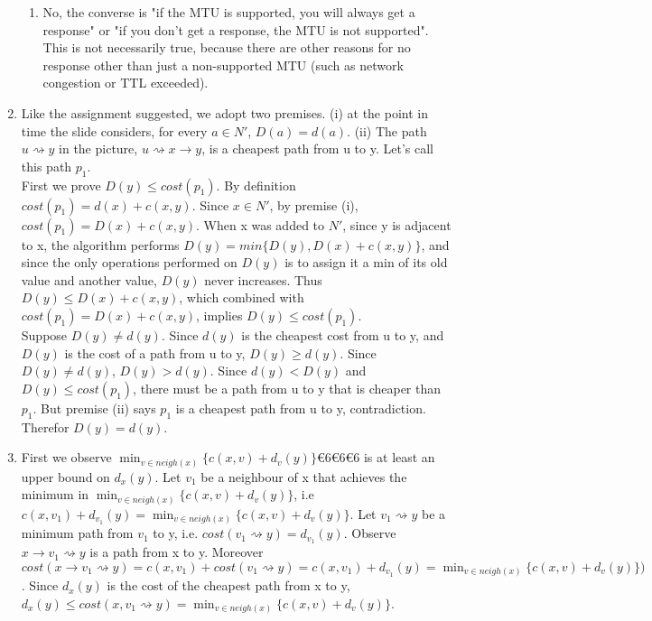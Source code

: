 \documentclass[12pt]{article}
\begin{document}
\begin{enumerate}
\begin{enumerate}
		\item No, the converse is "if the MTU is supported, you will always get a response" or "if you don't get a response, the MTU is not supported". This is not necessarily true, because there are other reasons for no response other than just a non-supported MTU (such as network congestion or TTL exceeded).
	\end{enumerate}
	\item %
        Like the assignment suggested, we adopt two premises. 
        (i) at the point in time the slide considers, for every $a \in N'$, $D(a) = d(a)$. 
        (ii) The path $u \rightsquigarrow y$ in the picture, $u \rightsquigarrow x \rightarrow y$,
        is a cheapest path from u to y. Let's call this path $p_1$.\\


        First we prove $D(y) \leq cost(p_1)$. By definition $cost(p_1) = d(x) + c(x,y)$. Since $x \in N'$, 
        by premise (i), $cost(p_1) = D(x) + c(x,y)$. When x was added to $N'$, since y is adjacent to x,
        the algorithm performs $D(y) = min\{D(y), D(x)+c(x,y)\}$, and since the only operations performed on $D(y)$ is to assign
        it a min of its old value and another value, $D(y)$ never increases. Thus $D(y) \leq D(x) + c(x,y)$,
        which combined with $cost(p_1) = D(x) + c(x,y)$, implies $D(y) \leq cost(p_1)$. \\

        Suppose $D(y) \neq d(y)$. Since $d(y)$ is the cheapest cost from u to y, and $D(y)$ is the 
        cost of a path from u to y, $D(y) \geq d(y)$. Since $D(y) \neq d(y)$, $D(y) > d(y)$. 
        Since $d(y) < D(y)$ and $D(y) \leq cost(p_1)$, there must be a path from u to y that is cheaper 
        than $p_1$. But premise (ii) says $p_1$ is a cheapest path from u to y, contradiction. Therefor $D(y) = d(y)$.
        

	\item %
        
        First we observe $\min_{v \in neigh(x)}\{c(x,v) + d_v(y)\}666$
        is at least an upper bound on $d_x(y)$. Let $v_1$ be a neighbour of x that achieves the minimum in
        $\min_{v \in neigh(x)}\{c(x,v) + d_v(y)\}$, i.e $c(x,v_1)+d_{v_1}(y) = \min_{v \in neigh(x)}\{c(x,v) + d_v(y)\}$.  
        Let $v_1 \rightsquigarrow y$ be a minimum path from $v_1$
        to y, i.e. $cost(v_1 \rightsquigarrow y) = d_{v_1}(y)$. Observe $x \rightarrow v_1 \rightsquigarrow y$ is a path from x to y. Moreover
        $cost(x \rightarrow v_1 \rightsquigarrow y) = c(x, v_1) + cost(v_1 \rightsquigarrow y) = c(x, v_1) + d_{v_1}(y) =
        \min_{v \in neigh(x)}\{c(x,v) + d_v(y)\})$.
        Since $d_x(y)$ is the cost of the cheapest path from x to y, 
        $d_x(y) \leq cost(x,v_1 \rightsquigarrow y) = \min_{v \in neigh(x)}\{c(x,v) + d_v(y)\}$. \\


\end{enumerate}
\end{document}
